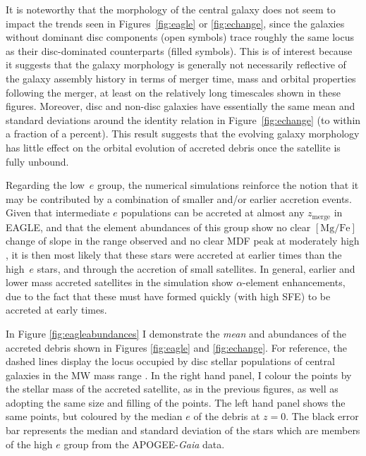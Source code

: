 It is noteworthy that the morphology of the central galaxy does not
seem to impact the trends seen in Figures~\ref{fig:eagle} or
\ref{fig:echange}, since the galaxies without dominant disc components
(open symbols) trace roughly the same locus as  their disc-dominated
counterparts (filled symbols). This is of interest because it
suggests that the galaxy morphology is generally not necessarily
reflective of the galaxy assembly history in terms of merger time,
mass and orbital properties following the merger, at least on the
relatively long timescales shown in these figures. Moreover,
disc and non-disc galaxies have essentially the same mean and
standard deviations around the identity relation in
Figure~\ref{fig:echange} (to within a fraction of a percent).  This
result suggests that the evolving galaxy morphology has little
effect on the orbital evolution of accreted debris once the satellite
is fully unbound.

Regarding the low~$e$ group, the numerical simulations reinforce
the notion that it may be contributed by a combination of smaller
and/or earlier accretion events. Given that intermediate $e$
populations can be accreted at almost any $z_{\mathrm{merge}}$ in
EAGLE, and that the element abundances of this group show no clear
$\mathrm{[Mg/Fe]}$ change of slope in the \feh{} range observed and
no clear MDF peak at moderately high \feh{}, it is then most likely
that these stars were accreted at earlier times than the high~$e$
stars, and through the accretion of small satellites. In general, earlier and lower mass
accreted satellites in the simulation show $\alpha$-element
enhancements, due to the fact that these must have formed quickly
(with high SFE) to be accreted at early times.

In Figure \ref{fig:eagleabundances} I demonstrate the {\it mean} \mgfe{}
and \feh{} abundances of the accreted debris shown in Figures
\ref{fig:eagle} and \ref{fig:echange}.  For reference, the dashed
lines display the locus occupied by disc stellar populations of
central galaxies in the MW mass range \citep[For example, galaxies like that
studied in Figure 6 of][]{2018MNRAS.477.5072M}.  In
the right hand panel, I colour the points by the stellar mass of
the accreted satellite, as in the previous figures, as well as
adopting the same size and filling of the points. The left hand
panel shows the same points, but coloured by the median $e$ of the
debris at $z=0$.  The black error bar represents the median
and standard deviation of the stars which are members of
the high $e$ group from the APOGEE-\emph{Gaia} data.

